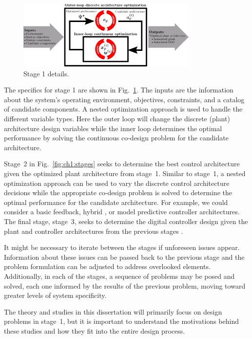 \begin{figure}
\centering
\includegraphics[width=0.8\textwidth]{../ch1/figures/outerinner2.pdf}
\caption{Stage 1 details.\label{fig:ch1:outerinner}}
\end{figure}

The specifics for stage 1 are shown in Fig.~\ref{fig:ch1:outerinner}.
The inputs are the information about the system's operating environment, objectives, constraints, and a catalog of candidate components.
A nested optimization approach is used to handle the different variable types.
Here the outer loop will change the discrete (plant) architecture design variables while the inner loop determines the optimal performance by solving the continuous co-design problem for the candidate architecture. 

Stage~2 in Fig.~\ref{fig:ch1:stages} seeks to determine the best control architecture given the optimized plant architecture from stage~1.
Similar to stage~1, a nested optimization approach can be used to vary the discrete control architecture decisions while the appropriate co-design problem is solved to determine the optimal performance for the candidate architecture.
For example, we could consider a basic feedback, hybrid \cite{Lygeros2008a}, or model predictive \cite{Borrelli2017a} controller architectures.
The final stage, stage~3, seeks to determine the digital controller design given the plant and controller architectures from the previous stages \cite{Landau2006a}.

It might be necessary to iterate between the stages if unforeseen issues appear.
Information about these issues can be passed back to the previous stage and the problem formulation can be adjusted to address overlooked elements.
Additionally, in each of the stages, a sequence of problems may be posed and solved, each one informed by the results of the previous problem, moving toward greater levels of system specificity.

The theory and studies in this dissertation will primarily focus on design problems in stage~1, but it is important to understand the motivations behind these studies and how they fit into the entire design process.